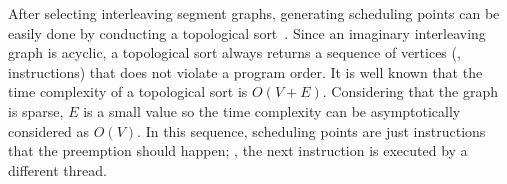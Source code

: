 %
After selecting interleaving segment graphs, generating scheduling
points can be easily done by conducting a topological
sort~\cite{topologicalsort}.
%
Since an imaginary interleaving graph is acyclic, a topological sort
always returns a sequence of vertices (\ie, instructions) that does
not violate a program order.
%
It is well known that the time complexity of a topological sort is
$O(V+E)$. Considering that the graph is sparse, $E$ is a small value
so the time complexity can be asymptotically considered as $O(V)$.
%
In this sequence, scheduling points are just instructions that the
preemption should happen; \ie, the next instruction is executed by a
different thread.




